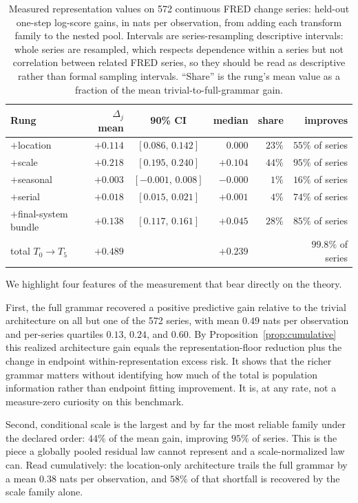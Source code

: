 \documentclass[11pt]{article}
\theoremstyle{remark}
\begin{document}
\begin{table}[t]
\centering
\begin{tabular}{lrcrrr}
\toprule
Rung & $\Delta_j$ mean & 90\% CI & median & share & improves\\
\midrule
$+$location & $+0.114$ & $[0.086,\,0.142]$ & $0.000$ & $23\%$ & $55\%$ of series\\
$+$scale & $+0.218$ & $[0.195,\,0.240]$ & $+0.104$ & $44\%$ & $95\%$ of series\\
$+$seasonal & $+0.003$ & $[-0.001,\,0.008]$ & $-0.000$ & $1\%$ & $16\%$ of series\\
$+$serial & $+0.018$ & $[0.015,\,0.021]$ & $+0.001$ & $4\%$ & $74\%$ of series\\
$+$final-system bundle & $+0.138$ & $[0.117,\,0.161]$ & $+0.045$ & $28\%$ & $85\%$ of series\\
\midrule
total $T_0\to T_5$ & $+0.489$ & & $+0.239$ & & $99.8\%$ of series\\
\bottomrule
\end{tabular}
\caption{Measured representation values on 572 continuous FRED change series: held-out one-step
log-score gains, in nats per observation, from adding each transform family to the nested pool.
Intervals are series-resampling descriptive intervals: whole series are resampled, which
respects dependence within a series but not correlation between related FRED series, so they
should be read as descriptive rather than formal sampling intervals. ``Share'' is the rung's mean value as a fraction of the mean
trivial-to-full-grammar gain.}
\label{tab:ladder}
\end{table}

We highlight four features of the measurement that bear directly on the theory.

First, the full grammar recovered a positive predictive gain relative to the trivial
architecture on all but one of the 572 series, with mean $0.49$ nats per observation and
per-series quartiles $0.13$, $0.24$, and $0.60$. By Proposition~\ref{prop:cumulative} this realized architecture gain equals the
representation-floor reduction plus the change in endpoint within-representation excess
risk. It shows that the richer grammar matters without identifying how much of the total is
population information rather than endpoint fitting improvement. It is, at any rate, not a
measure-zero curiosity on this benchmark.

Second, conditional scale is the largest and by far the most reliable family under the declared
order: $44\%$ of the mean gain, improving $95\%$ of series. This is the piece a globally pooled
residual law cannot represent and a scale-normalized law can. Read cumulatively: the
location-only architecture trails the full grammar by a mean $0.38$ nats per observation, and
$58\%$ of that shortfall is recovered by the scale family alone.
\end{document}
